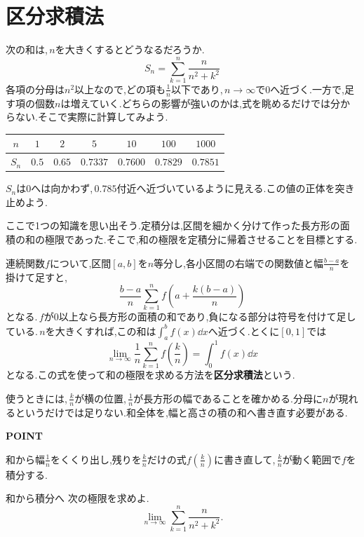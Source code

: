 \section{区分求積法}\label{節:和の区分求積}

次の和は,\,$n$を大きくするとどうなるだろうか.
\[
 S_n=\sum_{k=1}^{n}\frac{n}{n^2+k^2}
\]
各項の分母は$n^2$以上なので,どの項も$\frac1n$以下であり,\,$n\to\infty$で$0$へ近づく.一方で,足す項の個数$n$は増えていく.どちらの影響が強いのかは,式を眺めるだけでは分からない.そこで実際に計算してみよう.
\begin{center}
\begin{tabular}{ccccccc}
\toprule
$n$ & $1$ & $2$ & $5$ & $10$ & $100$ & $1000$\\
\midrule
$S_n$ & $0.5$ & $0.65$ & $0.7337$ & $0.7600$ & $0.7829$ & $0.7851$\\
\bottomrule
\end{tabular}
\end{center}
$S_n$は$0$へは向かわず,\,$0.785$付近へ近づいているように見える.この値の正体を突き止めよう.

ここで1つの知識を思い出そう.定積分は,区間を細かく分けて作った長方形の面積の和の極限であった.そこで,和の極限を定積分に帰着させることを目標とする.

連続関数$f$について,区間$[a,b]$を$n$等分し,各小区間の右端での関数値と幅$\frac{b-a}{n}$を掛けて足すと,
\[
 \frac{b-a}{n}\sum_{k=1}^{n}
 f\left(a+\frac{k(b-a)}{n}\right)
\]
となる.\,$f$が0以上なら長方形の面積の和であり,負になる部分は符号を付けて足している.\,$n$を大きくすれば,この和は$\int_a^b f(x)\dd x$へ近づく.とくに$[0,1]$では
\begin{equation}\label{式:単位区間の区分求積}
 \lim_{n\to\infty}\frac1n\sum_{k=1}^{n}f\left(\frac{k}{n}\right)
 =\int_0^1 f(x)\dd x
\end{equation}
となる.この式を使って和の極限を求める方法を\textbf{区分求積法}という.

使うときには,\,$\frac kn$が横の位置,\,$\frac1n$が長方形の幅であることを確かめる.分母に$n$が現れるというだけでは足りない.和全体を,幅と高さの積の和へ書き直す必要がある.

\begin{bookpoint}
\textbf{POINT}\par
和から幅$\frac1n$をくくり出し,残りを$\frac kn$だけの式$f\left(\frac kn\right)$に書き直して,\,$\frac kn$が動く範囲で$f$を積分する.
\end{bookpoint}

\begin{example}{和から積分へ}
次の極限を求めよ.
\[
 \lim_{n\to\infty}\sum_{k=1}^{n}\frac{n}{n^2+k^2}.
\]
\end{example}

